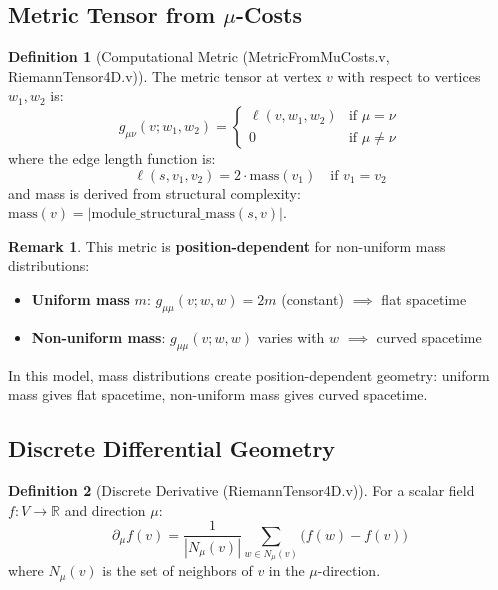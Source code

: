 \documentclass[11pt, a4paper]{report}
\theoremstyle{definition}
\newtheorem{definition}{Definition}[chapter]
\newtheorem{remark}{Remark}[chapter]
\theoremstyle{plain}
\begin{document}
\subsection{Metric Tensor from $\mu$-Costs}

\begin{definition}[Computational Metric {\normalfont (MetricFromMuCosts.v, RiemannTensor4D.v)}]
The metric tensor at vertex $v$ with respect to vertices $w_1, w_2$ is:
\begin{equation}
g_{\mu\nu}(v; w_1, w_2) = \begin{cases}
\ell(v, w_1, w_2) & \text{if } \mu = \nu \\
0 & \text{if } \mu \neq \nu
\end{cases}
\end{equation}
where the edge length function is:
\begin{equation}
\ell(s, v_1, v_2) = 2 \cdot \text{mass}(v_1) \quad \text{if } v_1 = v_2
\end{equation}
and mass is derived from structural complexity: $\text{mass}(v) = |\text{module\_structural\_mass}(s, v)|$.
\end{definition}

\begin{remark}
This metric is \textbf{position-dependent} for non-uniform mass distributions:
\begin{itemize}
    \item \textbf{Uniform mass} $m$: $g_{\mu\mu}(v; w, w) = 2m$ (constant) $\implies$ flat spacetime
    \item \textbf{Non-uniform mass}: $g_{\mu\mu}(v; w, w)$ varies with $w$ $\implies$ curved spacetime
\end{itemize}
In this model, mass distributions create position-dependent geometry: uniform mass gives flat spacetime, non-uniform mass gives curved spacetime.
\end{remark}

\subsection{Discrete Differential Geometry}

\begin{definition}[Discrete Derivative {\normalfont (RiemannTensor4D.v)}]
For a scalar field $f: V \to \mathbb{R}$ and direction $\mu$:
\begin{equation}
\partial_\mu f(v) = \frac{1}{|N_\mu(v)|} \sum_{w \in N_\mu(v)} \bigl(f(w) - f(v)\bigr)
\end{equation}
where $N_\mu(v)$ is the set of neighbors of $v$ in the $\mu$-direction.
\end{definition}
\end{document}
